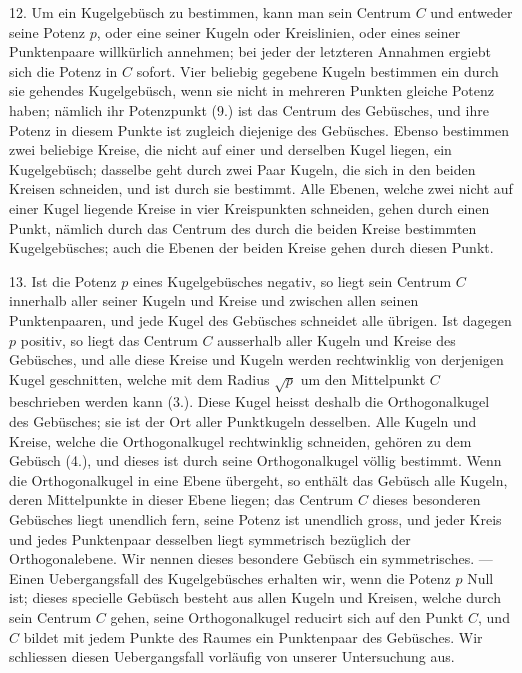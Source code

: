 12. Um ein Kugelgeb\"usch zu bestimmen, kann man
sein Centrum $C$ und entweder seine Potenz $p$, oder eine
seiner Kugeln oder Kreislinien, oder eines seiner Punktenpaare
willk\"urlich annehmen; bei jeder der letzteren Annahmen
ergiebt sich die Potenz in $C$ sofort. Vier beliebig gegebene
Kugeln bestimmen ein durch sie gehendes Kugelgeb\"usch,
wenn sie nicht in mehreren Punkten gleiche Potenz
haben; n\"amlich ihr Potenzpunkt (9.) ist das Centrum des
Geb\"usches, und ihre Potenz in diesem Punkte ist zugleich
diejenige des Geb\"usches. Ebenso bestimmen zwei beliebige
Kreise, die nicht auf einer und derselben Kugel liegen, ein
Kugelgeb\"usch; dasselbe geht durch zwei Paar Kugeln, die
sich in den beiden Kreisen schneiden, und ist durch sie bestimmt.
Alle Ebenen, welche zwei nicht auf einer Kugel
liegende Kreise in vier Kreispunkten schneiden, gehen durch
einen Punkt, n\"amlich durch das Centrum des durch die
beiden Kreise bestimmten Kugelgeb\"usches; auch die Ebenen
der beiden Kreise gehen durch diesen Punkt.

13. Ist die Potenz $p$ eines Kugelgeb\"usches negativ, so
liegt sein Centrum $C$ innerhalb aller seiner Kugeln und
Kreise und zwischen allen seinen Punktenpaaren, und jede
Kugel des Geb\"usches schneidet alle \"ubrigen. Ist dagegen $p$
positiv, so liegt das Centrum $C$ ausserhalb aller Kugeln und
Kreise des Geb\"usches, und alle diese Kreise und Kugeln
werden rechtwinklig von derjenigen Kugel geschnitten, welche
mit dem Radius $\sqrt{p}$ um den Mittelpunkt $C$ beschrieben
werden kann (3.). Diese Kugel heisst deshalb die {\glqq}Orthogonalkugel{\grqq}
des Geb\"usches; sie ist der Ort aller Punktkugeln
desselben. Alle Kugeln und Kreise, welche die Orthogonalkugel
rechtwinklig schneiden, geh\"oren zu dem Geb\"usch (4.),
und dieses ist durch seine Orthogonalkugel v\"ollig bestimmt.
Wenn die Orthogonalkugel in eine Ebene \"ubergeht, so enth\"alt
das Geb\"usch alle Kugeln, deren Mittelpunkte in dieser
Ebene liegen; das Centrum $C$ dieses besonderen Geb\"usches
liegt unendlich fern, seine Potenz ist unendlich gross, und
jeder Kreis und jedes Punktenpaar desselben liegt symmetrisch
bez\"uglich der Orthogonalebene. Wir nennen dieses
besondere Geb\"usch ein {\glqq}symmetrisches{\grqq}. --- Einen Uebergangsfall
des Kugelgeb\"usches erhalten wir, wenn die Potenz $p$ Null ist;
dieses specielle Geb\"usch besteht aus allen Kugeln und Kreisen,
welche durch sein Centrum $C$ gehen, seine Orthogonalkugel
reducirt sich auf den Punkt $C$, und $C$ bildet mit jedem Punkte
des Raumes ein Punktenpaar des Geb\"usches. Wir schliessen
diesen Uebergangsfall vorl\"aufig von unserer Untersuchung aus.

